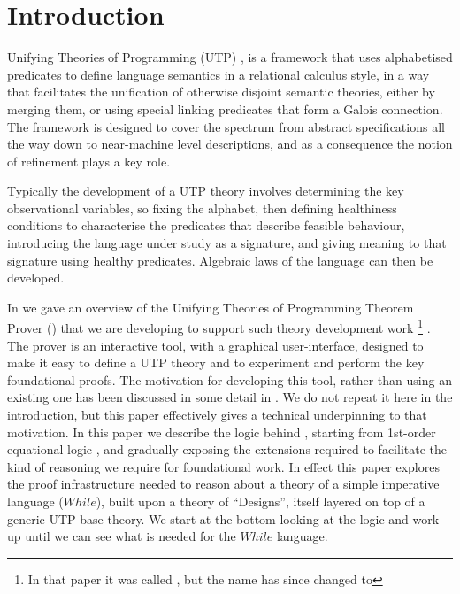 \section{Introduction}\label{sec:intro}


Unifying Theories of Programming (UTP) \cite{UTP-book},
is a framework that uses alphabetised predicates to define language
semantics in a relational calculus style, in a way that facilitates
the unification of otherwise disjoint semantic theories,
either by merging them, or using special linking predicates
that form a Galois connection. The framework is designed
to cover the spectrum from abstract specifications
all the way down to near-machine level descriptions,
and as a consequence the notion of refinement plays a key role.

Typically the development of a UTP theory involves determining the
key observational variables, so fixing the alphabet,
then defining healthiness conditions to characterise the predicates
that describe feasible behaviour, introducing the language under study
as a signature, and giving meaning to that signature using healthy predicates.
Algebraic laws of the language can then be developed.

In \cite{conf/utp/Butterfield10}
we gave an overview of the Unifying Theories of Programming Theorem Prover
()
that we are developing to support such theory development work%
\footnote{%
In that paper it was called \STHN, but the name has since changed to 
}%
.
The prover is an interactive tool, with a graphical user-interface,
designed to make it easy to define a UTP theory and to experiment
and perform the key foundational proofs.
The motivation for developing this tool,
rather than using an existing one has been discussed in some detail
in \cite{conf/utp/Butterfield10}.
We do not repeat it here in the introduction,
but this paper effectively gives a technical underpinning to that motivation.
In this paper we describe the logic behind ,
starting from 1st-order equational logic \cite{journals/logcom/Tourlakis01},
and gradually exposing the extensions required to facilitate the kind
of reasoning we require for foundational work.
In effect this paper explores the proof infrastructure needed
to reason about a theory of a simple imperative language ($While$),
built upon a theory of ``Designs'',
itself layered on top of a generic UTP base theory.
We start at the bottom looking at the logic and work up until
we can see what is needed for the $While$ language.

